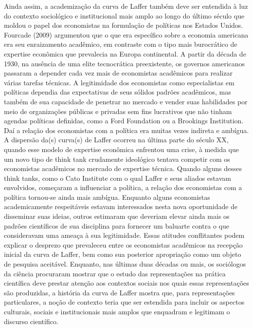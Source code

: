 \documentclass[12pt]{article}
\begin{document}
Ainda assim, a academização da curva de Laffer também deve ser entendida à luz do contexto sociológico e institucional mais amplo ao longo do último século que moldou o papel dos economistas na formulação de políticas nos Estados Unidos. Fourcade (2009) argumentou que o que era específico sobre a economia americana era seu enraizamento acadêmico, em contraste com o tipo mais burocrático de expertise econômica que prevalecia na Europa continental. A partir da década de 1930, na ausência de uma elite tecnocrática preexistente, os governos americanos passaram a depender cada vez mais de economistas acadêmicos para realizar várias tarefas técnicas. A legitimidade dos economistas como especialistas em políticas dependia das expectativas de seus sólidos padrões acadêmicos, mas também de sua capacidade de penetrar no mercado e vender suas habilidades por meio de organizações públicas e privadas sem fins lucrativos que não tinham agendas políticas definidas, como a Ford Foundation ou a Brookings Institution. Daí a relação dos economistas com a política era muitas vezes indireta e ambígua. A dispersão da(s) curva(s) de Laffer ocorreu na última parte do século XX, quando esse modelo de expertise econômica enfrentou uma crise, à medida que um novo tipo de think tank crudamente ideológico tentava competir com os economistas acadêmicos no mercado de expertise técnica. Quando alguns desses think tanks, como o Cato Institute com o qual Laffer e seus aliados estavam envolvidos, começaram a influenciar a política, a relação dos economistas com a política tornou-se ainda mais ambígua. Enquanto alguns economistas academicamente respeitáveis estavam interessados nesta nova oportunidade de disseminar suas ideias, outros estimaram que deveriam elevar ainda mais os padrões científicos de sua disciplina para fornecer um baluarte contra o que consideravam uma ameaça à sua legitimidade. Essas atitudes conflitantes podem explicar o desprezo que prevaleceu entre os economistas acadêmicos na recepção inicial da curva de Laffer, bem como sua posterior apropriação como um objeto de pesquisa aceitável. Enquanto, nas últimas duas décadas ou mais, os sociólogos da ciência procuraram mostrar que o estudo das representações na prática científica deve prestar atenção aos contextos sociais nos quais essas representações são produzidas, a história da curva de Laffer mostra que, para representações particulares, a noção de contexto teria que ser estendida para incluir os aspectos culturais, sociais e institucionais mais amplos que enquadram e legitimam o discurso científico.
\end{document}
